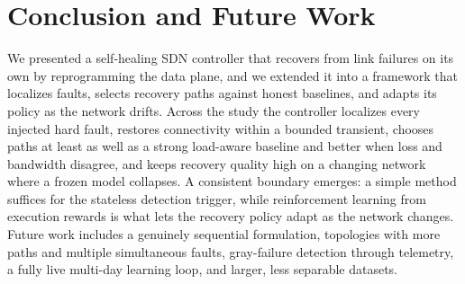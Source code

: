\documentclass[conference]{IEEEtran}
\begin{document}
\section{Conclusion and Future Work}
We presented a self-healing SDN controller that recovers from link failures on its
own by reprogramming the data plane, and we extended it into a framework that
localizes faults, selects recovery paths against honest baselines, and adapts its
policy as the network drifts. Across the study the controller localizes every
injected hard fault, restores connectivity within a bounded transient, chooses paths
at least as well as a strong load-aware baseline and better when loss and bandwidth
disagree, and keeps recovery quality high on a changing network where a frozen model
collapses. A consistent boundary emerges: a simple method suffices for the stateless detection
trigger, while reinforcement learning from execution rewards is what lets the recovery
policy adapt as the network changes.
Future work includes a genuinely sequential formulation, topologies with more paths
and multiple simultaneous faults, gray-failure detection through telemetry, a fully
live multi-day learning loop, and larger, less separable datasets.



\end{document}
